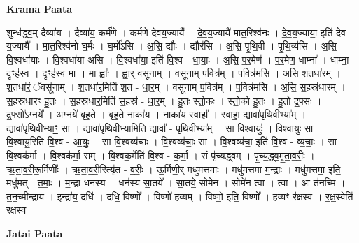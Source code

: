 \documentclass[17pt]{extarticle}
\begin{document}
\textbf{Krama Paata} \newline

शुन्ध॑द्ध्व॒म् दैव्या॑य । दैव्या॑य॒ कर्म॑णे । कर्म॑णे देवय॒ज्यायै᳚ । दे॒व॒य॒ज्यायै॑ मात॒रिश्व॑नः । दे॒व॒य॒ज्याया॒ इति॑ देव - य॒ज्यायै᳚ । मा॒त॒रिश्व॑नो घ॒र्मः । घ॒र्मो॑ऽसि । अ॒सि॒ द्यौः । द्यौर॑सि । अ॒सि॒ पृ॒थि॒वी । पृ॒थि॒व्य॑सि । अ॒सि॒ वि॒श्वधा॑याः । वि॒श्वधा॑या असि । वि॒श्वधा॑या॒ इति॑ वि॒श्व - धा॒याः॒ । अ॒सि॒ प॒र॒मेण॑ । प॒र॒मेण॒ धाम्ना᳚ । धाम्ना॒ दृꣳह॑स्व । दृꣳह॑स्व॒ मा । मा ह्वाः᳚ । ह्वा॒र् वसू॑नाम् । वसू॑नाम् प॒वित्र᳚म् । प॒वित्र॑मसि । अ॒सि॒ श॒तधा॑रम् । श॒तधा॑रं॒ ॅवसू॑नाम् । श॒तधा॑र॒मिति॑ श॒त - धा॒र॒म् । वसू॑नाम् प॒वित्र᳚म् । प॒वित्र॑मसि । अ॒सि॒ स॒हस्र॑धारम् । स॒हस्र॑धारꣳ हु॒तः । स॒हस्र॑धार॒मिति॑ स॒हस्र॑ - धा॒र॒म् । हु॒तः स्तो॒कः । स्तो॒को हु॒तः । हु॒तो द्र॒फ्सः । द्र॒फ्सो᳚ऽग्नये᳚ । अ॒ग्नये॑ बृह॒ते । बृ॒ह॒ते नाका॑य । नाका॑य॒ स्वाहा᳚ । स्वाहा॒ द्यावा॑पृथि॒वीभ्या᳚म् । द्यावा॑पृथि॒वीभ्याꣳ॒॒ सा । द्यावा॑पृथि॒वीभ्या॒मिति॒ द्यावा᳚ - पृ॒थि॒वीभ्या᳚म् । सा वि॒श्वायुः॑ । वि॒श्वायुः॒ सा । वि॒श्वायु॒रिति॑ वि॒श्व - आ॒युः॒ । सा वि॒श्वव्य॑चाः । वि॒श्वव्य॑चाः॒ सा । वि॒श्वव्य॑चा॒ इति॑ वि॒श्व - व्य॒चाः॒ । 
सा वि॒श्वक॑र्मा । वि॒श्वक॑र्मा॒ सम् । वि॒श्वक॒र्मेति॑ वि॒श्व - क॒र्मा॒ । सं पृ॑च्यद्ध्वम् । पृ॒च्य॒द्ध्व॒मृ॒ता॒व॒रीः॒ । ऋ॒ता॒व॒री॒रू॒र्मिणीः᳚ । ऋ॒ता॒व॒री॒रित्यृ॑त - व॒रीः॒ । ऊ॒र्मिणी॒र् मधु॑मत्तमाः । मधु॑मत्तमा म॒न्द्राः । मधु॑मत्तमा॒ इति॒ मधु॑मत् - त॒माः॒ । म॒न्द्रा धन॑स्य । धन॑स्य सा॒तये᳚ । 
सा॒तये॒ सोमे॑न । सोमे॑न त्वा । त्वा । आ त॑नच्मि । त॒न॒च्मीन्द्रा॑य । इन्द्रा॑य॒ दधि॑ । दधि॒ विष्णो᳚ । विष्णो॑ ह॒व्यम् । विष्णो॒ इति॒ विष्णो᳚ । ह॒व्यꣳ र॑क्षस्व । र॒क्ष॒स्वेति॑ रक्षस्व । \newline

\textbf{Jatai Paata} \newline
\end{document}
